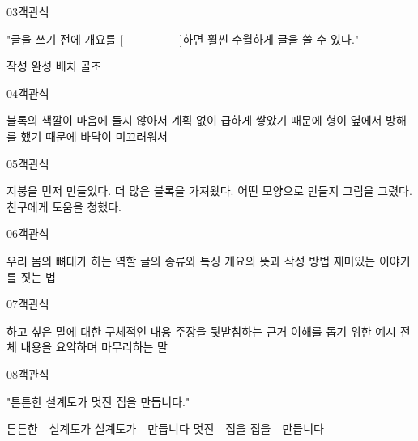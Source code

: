 \documentclass[fs11,seriesFre]{korfarm-base}
\begin{document}
\begin{kfQBlock}{03}{객관식}
\begin{kfEvidence}"글을 쓰기 전에 개요를 [　　　　　]하면 훨씬 수월하게 글을 쓸 수 있다."\end{kfEvidence}
\begin{kfChoices}
\kfChoice 작성
\kfChoice 완성
\kfChoice 배치
\kfChoice 골조
\end{kfChoices}
\end{kfQBlock}

\begin{kfQBlock}{04}{객관식}
\begin{kfChoices}
\kfChoice 블록의 색깔이 마음에 들지 않아서
\kfChoice 계획 없이 급하게 쌓았기 때문에
\kfChoice 형이 옆에서 방해를 했기 때문에
\kfChoice 바닥이 미끄러워서
\end{kfChoices}
\end{kfQBlock}

\begin{kfQBlock}{05}{객관식}
\begin{kfChoices}
\kfChoice 지붕을 먼저 만들었다.
\kfChoice 더 많은 블록을 가져왔다.
\kfChoice 어떤 모양으로 만들지 그림을 그렸다.
\kfChoice 친구에게 도움을 청했다.
\end{kfChoices}
\end{kfQBlock}

\begin{kfQBlock}{06}{객관식}
\begin{kfChoices}
\kfChoice 우리 몸의 뼈대가 하는 역할
\kfChoice 글의 종류와 특징
\kfChoice 개요의 뜻과 작성 방법
\kfChoice 재미있는 이야기를 짓는 법
\end{kfChoices}
\end{kfQBlock}

\begin{kfQBlock}{07}{객관식}
\begin{kfChoices}
\kfChoice 하고 싶은 말에 대한 구체적인 내용
\kfChoice 주장을 뒷받침하는 근거
\kfChoice 이해를 돕기 위한 예시
\kfChoice 전체 내용을 요약하며 마무리하는 말
\end{kfChoices}
\end{kfQBlock}

\begin{kfQBlock}{08}{객관식}
\begin{kfEvidence}"튼튼한 설계도가 멋진 집을 만듭니다."\end{kfEvidence}
\begin{kfChoices}
\kfChoice 튼튼한 - 설계도가
\kfChoice 설계도가 - 만듭니다
\kfChoice 멋진 - 집을
\kfChoice 집을 - 만듭니다
\end{kfChoices}
\end{kfQBlock}
\end{document}
